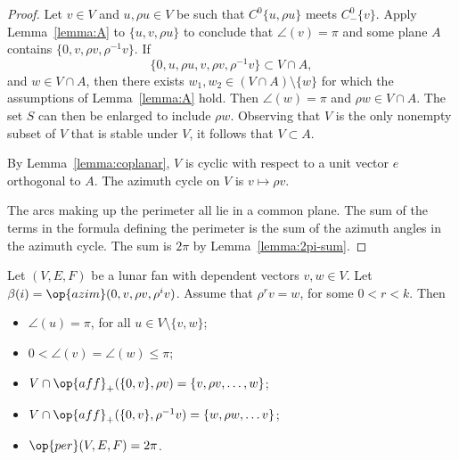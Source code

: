 \begin{proof}  Let $v\in V$ and $u,\rho u\in V$ be such that $C^0\{u,\rho u\}$ meets $C^0_-\{v\}$.  Apply
Lemma~\ref{lemma:A} to $\{u,v,\rho u\}$ to conclude that $\angle(v)=\pi$ and some plane $A$ contains
$\{0,v,\rho v,\rho^{-1} v\}$.  If 
$$
\{0,u,\rho u,v,\rho v,\rho^{-1} v\} \subset V\cap A,
$$
and $w\in V\cap A$, then there exists $w_1,w_2\in (V\cap A)\setminus\{w\}$ for which
the assumptions of Lemma~\ref{lemma:A} hold.  Then $\angle(w)=\pi$ and
$\rho w \in V\cap A$.  The set $S$ can then be enlarged to include $\rho w$.
Observing that $V$ is the only nonempty subset of $V$ that is stable under $V$,
 it follows that $V\subset A$.  


By Lemma~\ref{lemma:coplanar}, $V$ is cyclic with respect to a unit vector $e$ orthogonal to $A$.  The
azimuth cycle on $V$ is $v \mapsto \rho v$.
%

The arcs making up the perimeter all lie in a common plane.   The sum of the terms in the formula defining the perimeter is the sum of the azimuth angles in the azimuth cycle.  The sum is $2\pi$ by Lemma~\ref{lemma:2pi-sum}.
\end{proof}

\begin{lemma}\label{lemma:lunar}
Let $(V,E,F)$ be a lunar fan with dependent vectors $v,w\in V$.  
Let $\beta(i) = \op{azim}(0,v,\rho v,\rho^i v)$.  Assume that $\rho^r v = w$, for
some $0< r < k$.
Then
\begin{itemize}
\item $\angle(u) = \pi$, for all $u\in V\setminus \{v,w\}$; \vspace{3pt}
\item $0< \angle(v) = \angle(w)\le \pi$; \vspace{3pt}
\item $V\cap \op{aff}_+(\{0,v\},\rho v) = \{v,\rho v,\ldots, w\}$; \vspace{3pt}
\item $V \cap \op{aff}_+(\{0,v\},\rho^{-1} v) = \{w,\rho w,\ldots v\}$;  \vspace{3pt}
\item $\op{per}(V,E,F) = 2\pi$.
\end{itemize}
\end{lemma}

